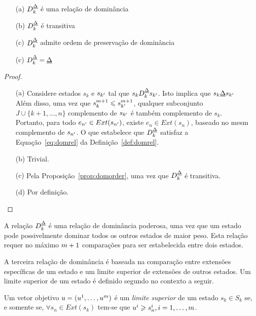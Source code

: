 \begin{myprop}
  \noindent
  \begin{enumerate}
    \item[(a)] $D_k^{\underline{\Delta}}$ é uma relação de dominância
    \item[(b)] $D_k^{\underline{\Delta}}$ é transitiva
    \item[(c)] $D_k^{\underline{\Delta}}$ admite ordem de preservação de dominância
    \item[(c)] $D_k^{\underline{\Delta}} = \underline{\Delta}$
\end{enumerate}
\end{myprop}

\begin{proof}
  \noindent
  \begin{enumerate}
    \item[(a)]{
      Considere estados $s_k$ e $s_{{k'}}$ tal que $s_k D_k^{\underline{\Delta}} s_{{k'}}$.
      Isto implica que $s_k \underline{\Delta} s_{{k'}}$ Além disso, uma vez que
      $s_k^{m+1} \leqslant s_{{k'}}^{m+1}$, qualquer subconjunto
      $J \cup \{k+1, \ldots, n\}$ complemento de $s_{{k'}}$ é também complemento
      de $s_k$.
      Portanto, para todo $e_{{n'}} \in Ext(s_{{n'}})$, existe
      $e_{n} \in Ext(s_{n})$, baseado no mesm complemento de $s_{{n'}}$.
      O que estabelece que $D_k^{\underline{\Delta}}$ satisfaz a Equação~\ref{eq:domrel}
      da Definição~\ref{def:domrel}.
    }
    \item[(b)]{Trivial.}
    \item[(c)]{Pela Proposição~\ref{prop:domorder}, uma vez que $D_k^{\underline{\Delta}}$ é transitiva.}
    \item[(d)]{Por definição.} \qedhere
  \end{enumerate}
\end{proof}
A relação $D_k^{\underline{\Delta}}$ é uma relação de dominância poderosa, uma vez que um estado
pode possivelmente dominar todos os outros estados de maior peso.
Esta relação requer no máximo $m+1$ comparações para ser estabelecida entre
dois estados.

A terceira relação de dominância é baseada na comparação entre extensões
específicas de um estado e um limite superior de extensões de outros estados.
Um limite superior de um estado é definido segundo no contexto a seguir.

\begin{mydef}
  Um vetor objetivo $u = (u^1, \ldots, u^m)$ é um \emph{limite superior}
  de um estado $s_k \in S_k$ se, e somente se, $\forall s_n \in Ext(s_k)$
  tem-se que $u^i \geqslant s_n^i, i = 1, \ldots, m$.
\end{mydef}

